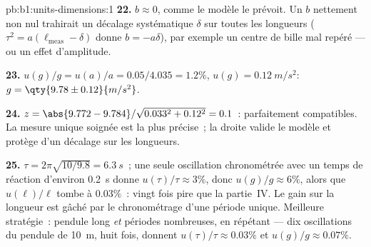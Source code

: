 \begin{solution}{pb:b1:units-dimensions:1}
\textbf{22.} $b \approx 0$, comme le modèle le prévoit. Un $b$
nettement non nul trahirait un décalage systématique $\delta$ sur toutes
les longueurs ($\tau^2 = a(\ell_{\text{meas}} - \delta)$ donne $b = -a\delta$),
par exemple un centre de bille mal repéré --- ou un effet d'amplitude.

\textbf{23.} $u(g)/g = u(a)/a = 0.05/4.035 = 1.2\%$, $u(g) =
\qty{0.12}{m/s^2}$: $g = \qty{9.78\pm0.12}{m/s^2}$.

\textbf{24.} $z = \abs{9.772 - 9.784}/\sqrt{0.033^2 + 0.12^2} = 0.1$~:
parfaitement compatibles. La mesure unique soignée est la plus précise~;
la droite valide le modèle et protège d'un décalage sur les longueurs.

\textbf{25.} $\tau = 2\pi\sqrt{10/9.8} = \qty{6.3}{s}$~; une seule
oscillation chronométrée avec un temps de réaction d'environ
\qty{0.2}{s} donne $u(\tau)/\tau \approx
3\%$, donc $u(g)/g \approx 6\%$, alors que $u(\ell)/\ell$ tombe à
$0.03\%$~: vingt fois pire que la partie~IV. Le gain sur la longueur est
gâché par le chronométrage d'une période unique. Meilleure stratégie~:
pendule long \emph{et} périodes nombreuses, en répétant --- dix
oscillations du pendule de \qty{10}{m}, huit fois, donnent
$u(\tau)/\tau \approx 0.03\%$ et $u(g)/g \approx 0.07\%$.
\end{solution}
